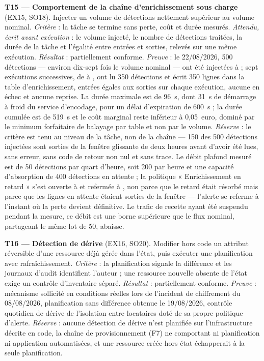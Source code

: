 \textbf{T15 --- Comportement de la chaîne d'enrichissement sous charge} (EX15, SO18). Injecter un
volume de détections nettement supérieur au volume nominal. \emph{Critère} : la tâche se termine
sans perte, coût et durée mesurés. \emph{Attendu, écrit avant exécution} : le volume injecté, le
nombre de détections traitées, la durée de la tâche et l'égalité entre entrées et sorties, relevés
sur une même exécution. \emph{Résultat} : partiellement conforme. \emph{Preuve} : le 22/08/2026,
500 détections --- environ dix-sept fois le volume nominal --- ont été injectées à  ;
sept exécutions successives, de  à , ont lu 350 détections et écrit
350 lignes dans la table d'enrichissement, entrées égales aux sorties sur chaque exécution, aucune
en échec et aucune reprise. La durée maximale est de 96~s, dont 31~s de démarrage à froid du
service d'encodage, pour un délai d'expiration de 600~s ; la durée cumulée est de 519~s et le coût
marginal reste inférieur à 0,05~euro, dominé par le minimum forfaitaire de balayage par table et
non par le volume. \emph{Réserve} : le critère est tenu au niveau de la tâche, non de la chaîne ---
150 des 500 détections injectées sont sorties de la fenêtre glissante de deux heures avant d'avoir
été lues, sans erreur, sans code de retour non nul et sans trace. Le débit plafond mesuré est de 50 détections par quart d'heure, soit 200 par heure et une capacité
d'absorption de 400 détections en attente ; la politique « Enrichissement en retard » s'est ouverte
à  et refermée à , non parce que le retard était résorbé mais parce que
les lignes en attente étaient sorties de la fenêtre --- l'alerte se referme à l'instant où la perte
devient définitive. Le trafic de recette ayant été suspendu pendant la mesure, ce débit est une
borne supérieure que le flux nominal, partageant le même lot de 50, abaisse.

\textbf{T16 --- Détection de dérive} (EX16, SO20). Modifier hors code un attribut réversible d'une
ressource déjà gérée dans l'état, puis exécuter une planification avec rafraîchissement.
\emph{Critère} : la planification signale la différence et les journaux d'audit identifient
l'auteur \cite{hashicorp_drift} ; une ressource nouvelle absente de l'état exige un contrôle
d'inventaire séparé. \emph{Résultat} : partiellement conforme. \emph{Preuve} : mécanisme sollicité en conditions réelles
lors de l'incident de chiffrement du 08/08/2026, planification sans différence obtenue le
19/08/2026, contrôle quotidien de dérive de l'isolation entre locataires doté de sa propre
politique d'alerte. \emph{Réserve} : aucune détection de dérive n'est planifiée sur l'infrastructure
décrite en code, la chaîne de provisionnement (F7) ne comportant ni planification ni application
automatisées, et une ressource créée hors état échapperait à la seule planification.


